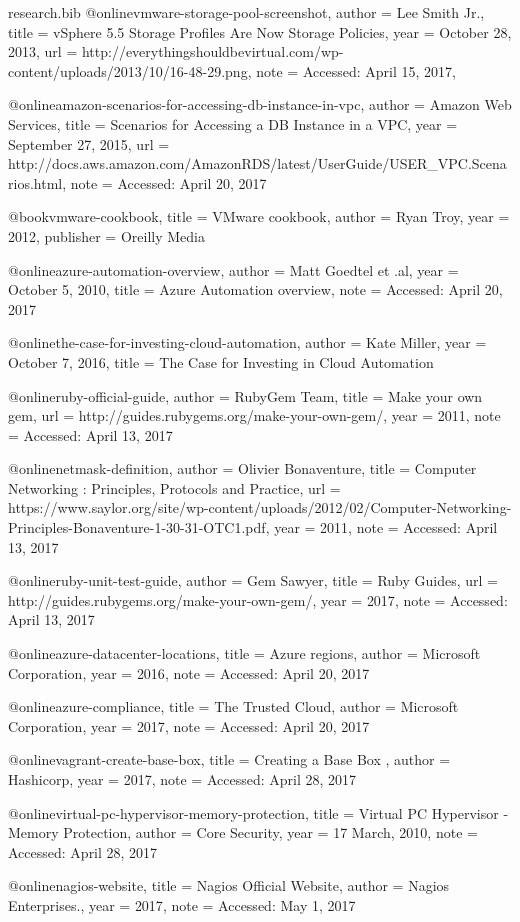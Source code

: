 \documentclass{article}
\begin{document}
\begin{filecontents*}{research.bib}
	@online{vmware-storage-pool-screenshot,
		author  = {Lee Smith Jr.},
		title   = {vSphere 5.5 Storage Profiles Are Now Storage Policies},
		year    = {October 28, 2013},
		url     = {http://everythingshouldbevirtual.com/wp-content/uploads/2013/10/16-48-29.png},
		note = {Accessed: April 15, 2017},
	}

	@online{amazon-scenarios-for-accessing-db-instance-in-vpc,
		author = {Amazon Web Services},
		title = {Scenarios for Accessing a DB Instance in a VPC},
		year = {September 27, 2015},
		url = {http://docs.aws.amazon.com/AmazonRDS/latest/UserGuide/USER_VPC.Scenarios.html},
		note = {Accessed: April 20, 2017}
	}

	@book{vmware-cookbook,
		title = {VMware cookbook},
		author = {Ryan Troy},
		year = {2012},
		publisher = {Oreilly Media}
	}

	@online{azure-automation-overview,
		author = {Matt Goedtel et .al},
		year = {October 5, 2010},
		title = {Azure Automation overview},
		note = {Accessed: April 20, 2017}
	}

	@online{the-case-for-investing-cloud-automation,
		author = {Kate Miller},
		year = {October 7, 2016},
		title = {The Case for Investing in Cloud Automation}
	}

    @online{ruby-official-guide,
		author = {RubyGem Team},
		title = {Make your own gem},
		url = {http://guides.rubygems.org/make-your-own-gem/},
		year = {2011},
		note = {Accessed: April 13, 2017}
	}

	@online{netmask-definition,
		author = {Olivier Bonaventure},
		title = {Computer Networking : Principles, Protocols and Practice},
		url = {https://www.saylor.org/site/wp-content/uploads/2012/02/Computer-Networking-Principles-Bonaventure-1-30-31-OTC1.pdf},
		year = {2011},
		note = {Accessed: April 13, 2017}
	}

	@online{ruby-unit-test-guide,
		author = {Gem Sawyer},
		title = {Ruby Guides},
		url = {http://guides.rubygems.org/make-your-own-gem/},
		year = {2017},
		note = {Accessed: April 13, 2017}
	}

	@online{azure-datacenter-locations,
		title = {Azure regions},
		author = {Microsoft Corporation},
		year = {2016},
		note = {Accessed: April 20, 2017}
	}

	@online{azure-compliance,
		title = {The Trusted Cloud},
		author = {Microsoft Corporation},
		year = {2017},
		note = {Accessed: April 20, 2017}
	}

	@online{vagrant-create-base-box,
		title = {Creating a Base Box },
		author = {Hashicorp},
		year = {2017},
		note = {Accessed: April 28, 2017}
	}

	@online{virtual-pc-hypervisor-memory-protection,
		title = {Virtual PC Hypervisor - Memory Protection},
		author = {Core Security},
		year = {17 March, 2010},
		note = {Accessed: April 28, 2017}
	}
	
	@online{nagios-website,
		title = {Nagios Official Website},
		author = {Nagios Enterprises.},
		year = {2017},
		note = {Accessed: May 1, 2017}
	}

\end{filecontents*}


\end{document}
